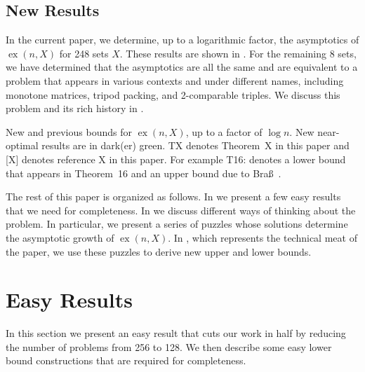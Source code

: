 \documentclass{patmorin}
\DeclareMathOperator{\ex}{ex}
\begin{document}
\subsection{New Results}

In the current paper, we determine, up to a logarithmic factor, the
asymptotics of $\ex(n,X)$ for 248 sets $X$.  These results are shown in
. For the remaining 8 sets, we have determined that
the asymptotics are all the same and are equivalent to a problem that
appears in various contexts and under different names, including monotone
matrices, tripod packing, and 2-comparable triples. We discuss this
problem and its rich history in .  

\begin{table}
  \caption{New and previous bounds for $\ex(n,X)$, up to a factor of $\log n$.
  New near-optimal results are in dark(er) green. TX denotes Theorem~X in this paper and [X] denotes reference X in this paper. For example T16:\cite{brass:turan} denotes a lower bound that appears in Theorem~16 and an upper bound due to Bra\ss\ \cite{brass:turan}.}
\end{table}

The rest of this paper is organized as follows.  In
 we present a few easy results that we need for
completeness.  In  we discuss different ways
of thinking about the problem.  In particular, we present a series of
puzzles whose solutions determine the asymptotic growth of $\ex(n,X)$.
In , which represents the technical meat of the paper,
we use these puzzles to derive new upper and lower bounds.

\section{Easy Results}

In this section we present an easy result that cuts our work in half
by reducing the number of problems from 256 to 128.  We then describe some
easy lower bound constructions that are required for completeness.
\end{document}

